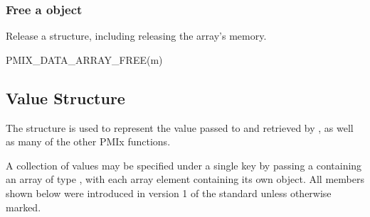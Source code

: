 \begin{arglist}
\end{arglist}


\subsubsection{Free a object}

Release a  structure, including releasing the array's memory.

\cspecificstart
\begin{codepar}
PMIX_DATA_ARRAY_FREE(m)
\end{codepar}
\cspecificend

\begin{arglist}
\end{arglist}

\subsection{Value Structure}

The  structure is used to represent the value passed to  and retrieved by , as well as many of the other \ac{PMIx} functions.

A collection of values may be specified under a single key by passing a  containing an array of type , with each array element containing its own object. All members shown below were introduced in version 1 of the standard unless otherwise marked.

